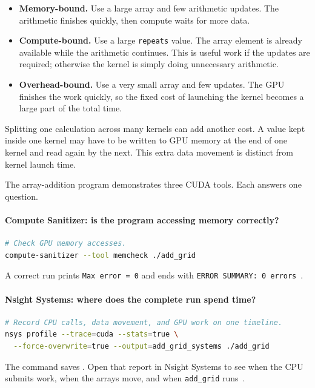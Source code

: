 \documentclass[11pt]{article}
\numberwithin{equation}{section}
\numberwithin{figure}{section}
\numberwithin{table}{section}
\newcommand{\code}[1]{\texttt{#1}}
\begin{document}
\begin{itemize}
  \item \textbf{Memory-bound.}  Use a large array and few arithmetic updates.
  The arithmetic finishes quickly, then compute waits for more data.

  \item \textbf{Compute-bound.}  Use a large \code{repeats} value.  The array
  element is already available while the arithmetic continues.  This is useful
  work if the updates are required; otherwise the kernel is simply doing
  unnecessary arithmetic.

  \item \textbf{Overhead-bound.}  Use a very small array and few updates.  The GPU
  finishes the work quickly, so the fixed cost of launching the kernel becomes a
  large part of the total time.
\end{itemize}

Splitting one calculation across many kernels can add another cost.  A value kept
inside one kernel may have to be written to GPU memory at the end of one kernel and
read again by the next.  This extra data movement is distinct from kernel launch
time.

The array-addition program demonstrates three CUDA tools.  Each answers one
question.

\paragraph{Compute Sanitizer: is the program accessing memory correctly?}
\begin{lstlisting}[language=bash,numbers=none]
# Check GPU memory accesses.
compute-sanitizer --tool memcheck ./add_grid
\end{lstlisting}
A correct run prints \code{Max error = 0} and ends with
\code{ERROR SUMMARY: 0 errors}~\cite{computesanitizer2026}.

\paragraph{Nsight Systems: where does the complete run spend time?}
\begin{lstlisting}[language=bash,numbers=none]
# Record CPU calls, data movement, and GPU work on one timeline.
nsys profile --trace=cuda --stats=true \
  --force-overwrite=true --output=add_grid_systems ./add_grid
\end{lstlisting}
The command saves .  Open that report in Nsight
Systems to see when the CPU submits work, when the arrays move, and when
\code{add\_grid} runs~\cite{nsightsystems2026}.
\end{document}
